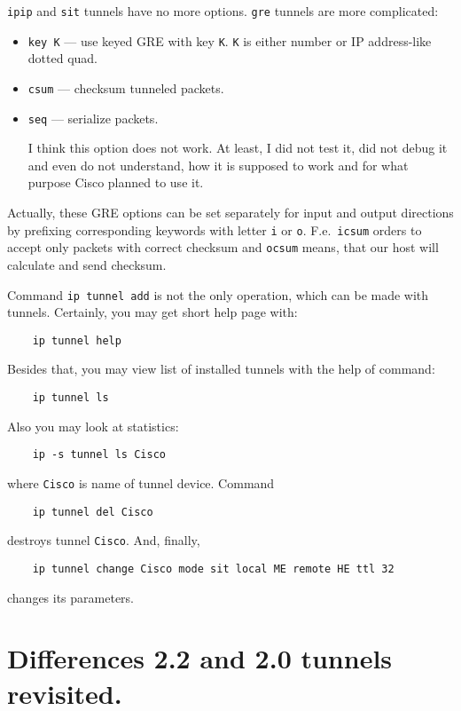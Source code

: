 \verb|ipip| and \verb|sit| tunnels have no more options. \verb|gre|
tunnels are more complicated:

\begin{itemize}

\item \verb|key K| --- use keyed GRE with key \verb|K|. \verb|K| is
	either number or IP address-like dotted quad.

\item \verb|csum| --- checksum tunneled packets.

\item \verb|seq| --- serialize packets.
\begin{NB}
	I think this option does not
	work. At least, I did not test it, did not debug it and
	even do not understand,	how it is supposed to work and for what
	purpose Cisco planned to use it.
\end{NB}

\end{itemize}


Actually, these GRE options can be set separately for input and
output directions by prefixing corresponding keywords with letter
\verb|i| or \verb|o|. F.e.\ \verb|icsum| orders to accept only
packets with correct checksum and \verb|ocsum| means, that
our host will calculate and send checksum.

Command \verb|ip tunnel add| is not the only operation,
which can be made with tunnels. Certainly, you may get short help page
with:
\begin{verbatim}
    ip tunnel help
\end{verbatim}

Besides that, you may view list of installed tunnels with the help of command:
\begin{verbatim}
    ip tunnel ls
\end{verbatim}
Also you may look at statistics:
\begin{verbatim}
    ip -s tunnel ls Cisco
\end{verbatim}
where \verb|Cisco| is name of tunnel device. Command
\begin{verbatim}
    ip tunnel del Cisco
\end{verbatim}
destroys tunnel \verb|Cisco|. And, finally,
\begin{verbatim}
    ip tunnel change Cisco mode sit local ME remote HE ttl 32
\end{verbatim}
changes its parameters.

\section{Differences 2.2 and 2.0 tunnels revisited.}

